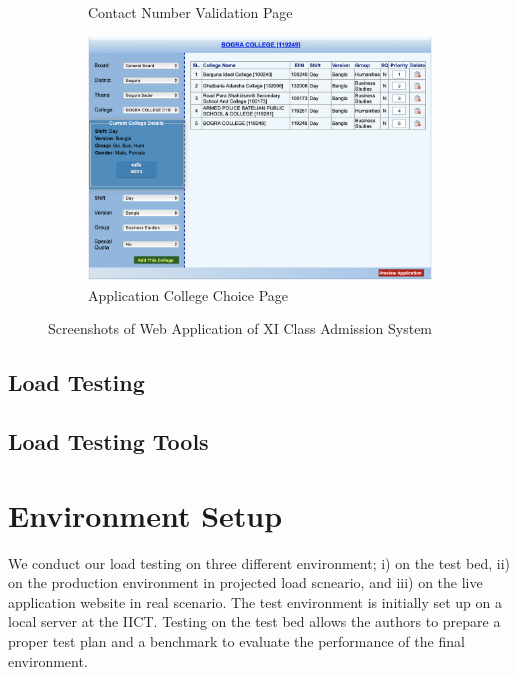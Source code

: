 \documentclass[sigconf,authordraft]{acmart}
\begin{document}
\begin{figure}[t]
\begin{subfigure}{.48\linewidth}
		\caption{Contact Number Validation Page}
		\label{fig:contact_check}
	\end{subfigure}
	\begin{subfigure}{.48\linewidth}
		\includegraphics[width = \linewidth]{choice_page}
		\caption{Application College Choice Page}
		\label{fig:choice}
	\end{subfigure}
\caption{Screenshots of Web Application of XI Class Admission System}
\label{fig:screenshots}
\end{figure}   

\subsection{Load Testing}

\subsection{Load Testing Tools}

\section{Environment Setup}
We conduct our load testing on three different environment; i) on the test bed, ii) on the production environment in projected load scneario, and iii) on the live application website in real scenario. The test environment is initially set up on a local server at the IICT. Testing on the test bed allows the authors to prepare a proper test plan and a benchmark to evaluate the performance of the final environment. 
\end{document}
